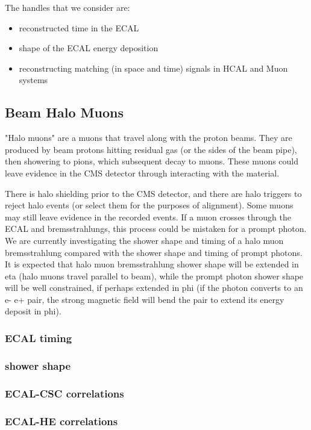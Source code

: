 \documentclass{cmspaper}
\begin{document}
The handles that we consider are:
\begin{itemize}
\item reconstructed time in the ECAL
\item shape of the ECAL energy deposition
\item reconstructing matching (in space and time) signals in HCAL and Muon systems   
\end{itemize}

\subsection{Beam Halo Muons}

"Halo muons" are a muons that travel along with the proton beams. They are
produced by beam protons hitting residual gas (or the sides of the
beam pipe), then showering to pions, which subsequent decay to muons.
These muons could leave evidence in the CMS detector through interacting with
the material.

There is halo shielding prior to the CMS detector, and there are halo
triggers to reject halo events (or select them for the purposes of alignment). 
Some muons may still leave evidence in the recorded events.  If a muon crosses through the 
ECAL and bremsstrahlungs, this process could be mistaken for a prompt photon. 
We are currently investigating the shower shape and timing of a halo muon bremsstrahlung compared with
the shower shape and timing of prompt photons.  It is expected that halo muon
bremsstrahlung shower shape will be extended in eta (halo muons travel
parallel to beam), while the prompt photon shower shape will be well constrained, if perhaps
extended in phi (if the photon converts to an e- e+ pair, the strong
magnetic field will bend the pair to extend its energy deposit in phi).
\subsubsection{ECAL timing}

\subsubsection{shower shape}

\subsubsection{ECAL-CSC correlations}

\subsubsection{ECAL-HE correlations}
\end{document}
